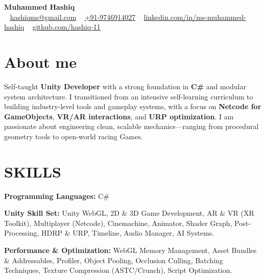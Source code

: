 \documentclass[10pt, letterpaper]{article}
\begin{document}
\begin{center}
    {\fontsize{20pt}{22pt}\textbf{Muhammed Hashiq}} \\[4pt]
    \small
    \faEnvelope~ \href{mailto:hashiqms@gmail.com}{hashiqms@gmail.com} \quad
    \faPhone~ \href{tel:+91-9746914027}{+91-9746914027} \quad
    \faLinkedin~ \href{https://www.linkedin.com/in/ms-muhammed-hashiq/}{linkedin.com/in/ms-muhammed-hashiq} \quad
    \faGithub~ \href{https://github.com/hashiq-11}{github.com/hashiq-11}
\end{center}


\section{About me}
\vspace{0.1 cm}
\begin{onecolentry}
Self-taught \textbf{Unity Developer} with a strong foundation in \textbf{C\#} and modular system architecture. I transitioned from an intensive self-learning curriculum to building industry-level tools and gameplay systems, with a focus on \textbf{Netcode for GameObjects}, \textbf{VR/AR interactions}, and \textbf{URP optimization}. I am passionate about engineering clean, scalable mechanics—ranging from procedural geometry tools to open-world racing Games.
\end{onecolentry}

\vspace{0.1 cm}

\section{SKILLS}

\textbf{Programming Languages:} C\#

\vspace{0.2cm}

\textbf{Unity Skill Set:}  
Unity WebGL, 2D \& 3D Game Development, AR \& VR (XR Toolkit), Multiplayer (Netcode), Cinemachine, Animator, Shader Graph, Post-Processing, HDRP \& URP, Timeline, Audio Manager, AI Systems.

\vspace{0.2cm}

\textbf{Performance \& Optimization:}  
WebGL Memory Management, Asset Bundles \& Addressables, Profiler, Object Pooling, Occlusion Culling, Batching Techniques, Texture Compression (ASTC/Crunch), Script Optimization.
\end{document}
